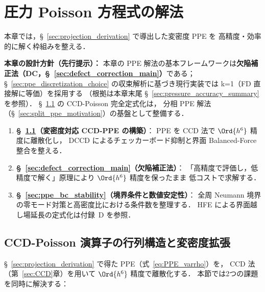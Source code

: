 %
%
\section{圧力 Poisson 方程式の解法}
\label{sec:ppe_solve}

本章では，§~\ref{sec:projection_derivation} で導出した変密度 PPE を
高精度・効率的に解く枠組みを整える．

\noindent\textbf{本章の設計方針（先行提示）：}
本章の PPE 解法の基本フレームワークは\textbf{欠陥補正法（DC，§~\ref{sec:defect_correction_main}）}である；
§~\ref{sec:ppe_discretization_choice} の収束解析に基づき現行実装では k=1（FD 直接解に等価）を採用する
（根拠は本章末尾 §~\ref{sec:pressure_accuracy_summary} を参照）．
§~\ref{sec:ccd_poisson_matrix} の CCD-Poisson 完全定式化は，
分相 PPE 解法（§~\ref{sec:split_ppe_motivation}）の基盤として整備する．

\begin{enumerate}
  \item \textbf{§~\ref{sec:ccd_poisson_matrix}（変密度対応 CCD-PPE の構築）}：
        PPE を CCD 法で $\Ord{h^6}$ 精度に離散化し，
        DCCD によるチェッカーボード抑制と界面 Balanced-Force 整合を整える．
  \item \textbf{§~\ref{sec:defect_correction_main}（欠陥補正法）}：
        「高精度で評価し，低精度で解く」原理により $\Ord{h^6}$ 精度を保ったまま
        低コストで求解する．
  \item \textbf{§~\ref{sec:ppe_bc_stability}（境界条件と数値安定性）}：
        全周 Neumann 境界の零モード対策と高密度比における条件数を整理する．
        HFE による界面越し場延長の定式化は付録~D を参照．
\end{enumerate}

\subsection{CCD-Poisson 演算子の行列構造と変密度拡張}
\label{sec:ccd_poisson_matrix}

§~\ref{sec:projection_derivation} で得た PPE（式~\eqref{eq:PPE_varrho}）を，
CCD 法（第~\ref{sec:CCD}章）を用いて $\Ord{h^6}$ 精度で離散化する．
本節では2つの課題を同時に解決する：

